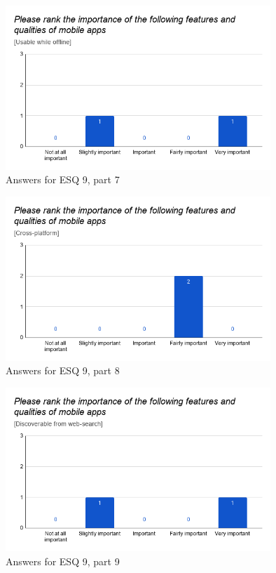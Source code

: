 \documentclass[a4paper,12pt]{article}
\begin{document}
\begin{figure}[ht!]
    \centering
    \includegraphics[width=10cm]{img/Results/esq9_7.png}
    \caption{Answers for ESQ 9, part 7}
    \label{fig:res_eduq9_7}
\end{figure}

\begin{figure}[ht!]
    \centering
    \includegraphics[width=10cm]{img/Results/esq9_8.png}
    \caption{Answers for ESQ 9, part 8}
    \label{fig:res_eduq9_8}
\end{figure}

\begin{figure}[ht!]
    \centering
    \includegraphics[width=10cm]{img/Results/esq9_9.png}
    \caption{Answers for ESQ 9, part 9}
    \label{fig:res_eduq9_9}
\end{figure}
\end{document}
